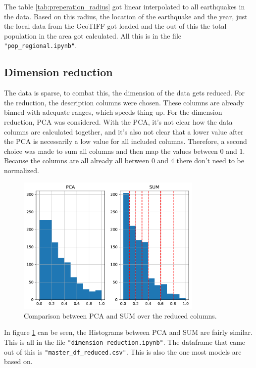 \documentclass[a4paper]{article}
\newcommand\Plotwidth{0.8}
\begin{document}
The table \ref{tab:preperation_radius} got linear interpolated to all earthquakes in the data. Based on this radius, the location of the earthquake and the year, just the local data from the GeoTIFF got loaded and the out of this the total population in the area got calculated. All this is in the file \lstinline{"pop_regional.ipynb"}.

\subsection{Dimension reduction}

The data is sparse, to combat this, the dimension of the data gets reduced. For the reduction, the description columns were chosen. These columns are already binned with adequate ranges, which speeds thing up. For the dimension reduction, PCA was considered. With the PCA, it's not clear how the data columns are calculated together, and it's also not clear that a lower value after the PCA is necessarily a low value for all included columns. Therefore, a second choice was made to sum all columns and then map the values between 0 and 1. Because the columns are all already all between 0 and 4 there don't need to be normalized.

\begin{figure}[h]
    \centering
    \includegraphics[width=\Plotwidth\textwidth]{Plots/PCA_SUM.pdf}
    \caption{Comparison between PCA and SUM over the reduced columns.}
    \label{fig:PCA_SUM}
\end{figure}

In figure \ref{fig:PCA_SUM} can be seen, the Histograms between PCA and SUM are fairly similar. This is all in the file \lstinline{"dimension_reduction.ipynb"}. The dataframe that came out of this is \lstinline{"master_df_reduced.csv"}. This is also the one most models are based on.
\end{document}
